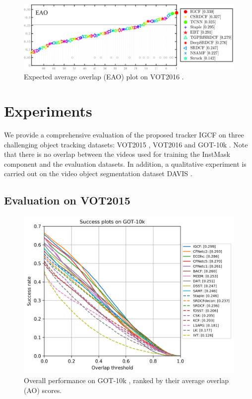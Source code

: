 \begin{figure}
    \centering
    \includegraphics[width=1.0\textwidth]{Img/IGCF/vot/eao_rank_vot2016.png}
    \caption{Expected average overlap (EAO) plot on VOT2016 \cite{Kristan2016TheVO}.}
    \label{fig:vot16}
\end{figure}

\section{Experiments}
We provide a comprehensive evaluation of the proposed tracker IGCF on three challenging object tracking datasets: VOT2015 \cite{Kristan2015TheVO}, VOT2016 \cite{Kristan2016TheVO} and GOT-10k \cite{GOT-10k}. Note that there is no overlap between the videos used for training the InstMask component and the evaluation datasets. In addition, a qualitative experiment is carried out on the video object segmentation dataset DAVIS \cite{Perazzi2016}.
\subsection{Evaluation on VOT2015}

\begin{figure}
    \centering
    \includegraphics[width=1.0\textwidth]{Img/IGCF/got10k/success_plot.png}
    \caption{Overall performance on GOT-10k \cite{GOT-10k}, ranked by their average overlap (AO) scores.}
    \label{fig:got10k}
\end{figure}

